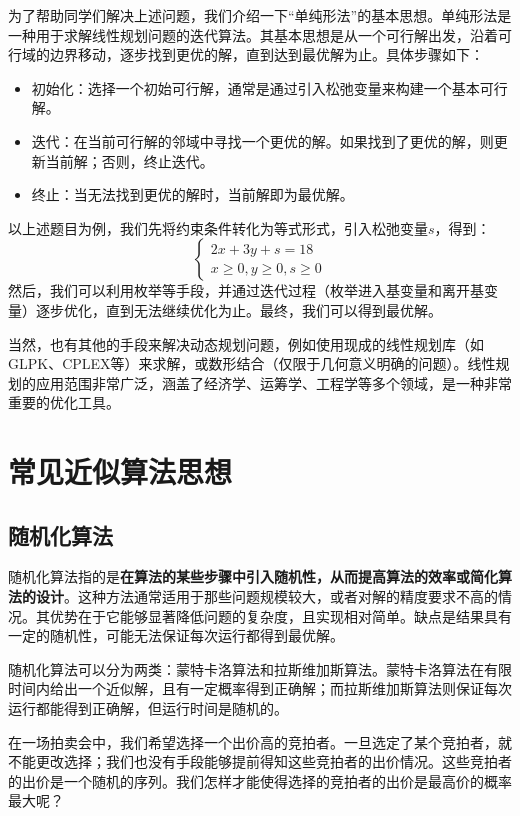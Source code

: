 为了帮助同学们解决上述问题，我们介绍一下“单纯形法”的基本思想。单纯形法是一种用于求解线性规划问题的迭代算法。其基本思想是从一个可行解出发，沿着可行域的边界移动，逐步找到更优的解，直到达到最优解为止。具体步骤如下：
\begin{itemize}
    \item 初始化：选择一个初始可行解，通常是通过引入松弛变量来构建一个基本可行解。
    \item 迭代：在当前可行解的邻域中寻找一个更优的解。如果找到了更优的解，则更新当前解；否则，终止迭代。
    \item 终止：当无法找到更优的解时，当前解即为最优解。
\end{itemize}
以上述题目为例，我们先将约束条件转化为等式形式，引入松弛变量$s$，得到：
\[
    \begin{cases}
        2x + 3y + s = 18 \\
        x \geq 0, y \geq 0, s \geq 0
    \end{cases}
\]
然后，我们可以利用枚举等手段，并通过迭代过程（枚举进入基变量和离开基变量）逐步优化，直到无法继续优化为止。最终，我们可以得到最优解。

当然，也有其他的手段来解决动态规划问题，例如使用现成的线性规划库（如GLPK、CPLEX等）来求解，或数形结合（仅限于几何意义明确的问题）。线性规划的应用范围非常广泛，涵盖了经济学、运筹学、工程学等多个领域，是一种非常重要的优化工具。

\section{常见近似算法思想}

\subsection{随机化算法}

随机化算法指的是\textbf{在算法的某些步骤中引入随机性，从而提高算法的效率或简化算法的设计}。这种方法通常适用于那些问题规模较大，或者对解的精度要求不高的情况。其优势在于它能够显著降低问题的复杂度，且实现相对简单。缺点是结果具有一定的随机性，可能无法保证每次运行都得到最优解。

随机化算法可以分为两类：蒙特卡洛算法和拉斯维加斯算法。蒙特卡洛算法在有限时间内给出一个近似解，且有一定概率得到正确解；而拉斯维加斯算法则保证每次运行都能得到正确解，但运行时间是随机的。

\begin{example}
    在一场拍卖会中，我们希望选择一个出价高的竞拍者。一旦选定了某个竞拍者，就不能更改选择；我们也没有手段能够提前得知这些竞拍者的出价情况。这些竞拍者的出价是一个随机的序列。我们怎样才能使得选择的竞拍者的出价是最高价的概率最大呢？
\end{example}

